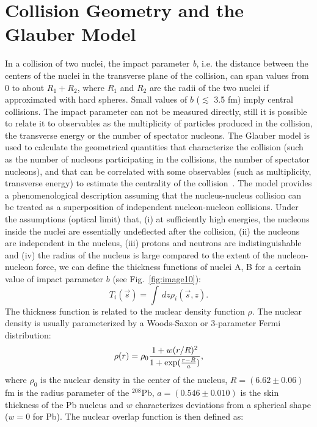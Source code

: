 \section{Collision Geometry and the Glauber Model}
In a collision of two nuclei, the impact parameter \textit{b}, i.e. the distance 
between the centers of the nuclei in the transverse plane of the collision, can 
span values from 0 to about $R_1+R_2$, where  $R_1$ and  $R_2$ are the radii of 
the two nuclei if approximated with hard spheres. 
Small values of $b$ ($\lesssim$ 3.5 fm) imply central collisions. 
The impact parameter can not be measured directly, still it is 
possible to relate it to observables as the multiplicity of particles produced in the 
collision, the transverse 
energy or the number of spectator nucleons. 
The Glauber model is used to calculate the geometrical quantities that 
characterize the collision (such as the number of nucleons participating in the collisions,
the number of spectator nucleons), and that can be correlated with some
observables (such as multiplicity, transverse energy) to estimate the centrality of the
collision~\cite{Miller:2007ri}.
The model provides a phenomenological description assuming that the nucleus-nucleus 
collision can be treated as a superposition of independent nucleon-nucleon collisions.
Under the assumptions (optical limit) that, (i) at sufficiently high energies, the nucleons 
inside the nuclei are essentially undeflected after the collision, (ii) the
 nucleons are independent in the nucleus, (iii) protons and neutrons 
 are indistinguishable and (iv) the radius of the nucleus is large compared 
 to the extent of the nucleon-nucleon force, we can define the thickness 
 functions of nuclei A, B for a certain value of impact parameter $b$ (see Fig.~\ref{fig:image10}):
\begin{equation}
T_i(\vec s) = \int\,dz \rho_i(\vec s,z).
\end{equation}
The thickness function is related to the nuclear density function $\rho$. The nuclear 
density is usually parameterized by a Woods-Saxon or 3-parameter Fermi distribution:
\begin{equation}
\rho (r) = \rho_0 \frac{1+w(r/R)^2}{1+{\rm exp}(\frac{r-R}{a})},
\end{equation}
where $\rho_0$ is the nuclear density in the center of the nucleus, 
$R = (6.62 \pm 0.06)$ fm is the radius parameter of the ${}^{208}$Pb, 
$a = (0.546 \pm 0.010)$ is the skin thickness of the Pb nucleus and $w$ 
characterizes deviations from a spherical shape ($w=0$ for Pb). 
The nuclear overlap function is then defined as:
